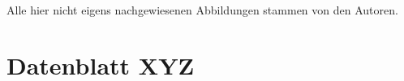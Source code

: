 \documentclass[12pt]{report} %
\begin{document}



\setcounter{page}{\value{romanPagenumber}}


\listoffigures
Alle hier nicht eigens nachgewiesenen Abbildungen stammen von den Autoren.
\clearpage


\listoftables
\clearpage


\renewcommand{\bibname}{Literatur- und Quellenverzeichnis}	%
\printbibliography[heading=bibintoc]
\clearpage


\appendix
\chapter{Datenblatt XYZ}

\end{document}
